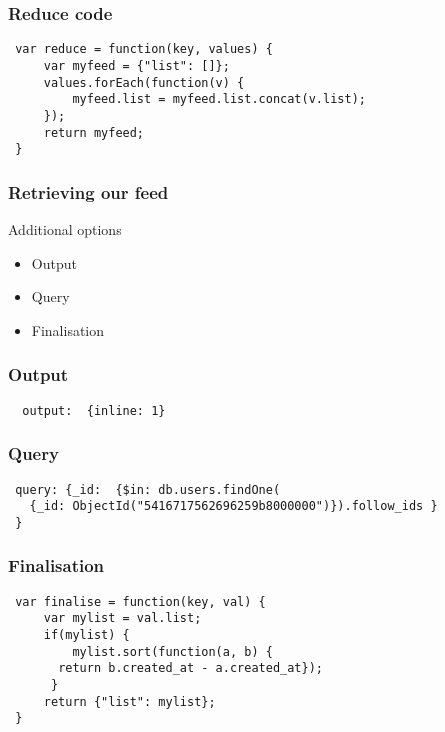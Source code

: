 \documentclass[10pt]{beamer}
\begin{document}
\begin{frame}[fragile]
  \frametitle{Reduce code}

 \begin{verbatim}
 var reduce = function(key, values) {
     var myfeed = {"list": []};
     values.forEach(function(v) {
         myfeed.list = myfeed.list.concat(v.list);
     });
     return myfeed;
 }
	     \end{verbatim}

\end{frame}


\begin{frame}
  \frametitle{Retrieving our feed}

  Additional options
 \begin{itemize}
  \item Output
  \item Query
  \item Finalisation
 \end{itemize}


\end{frame}
\begin{frame}[fragile]

  \frametitle{Output}

 \begin{verbatim}
  output:  {inline: 1}
 \end{verbatim}

\end{frame}


\begin{frame}[fragile]
  \frametitle{Query}

 \begin{verbatim}
 query: {_id:  {$in: db.users.findOne(
   {_id: ObjectId("5416717562696259b8000000")}).follow_ids }
 }
 \end{verbatim}

\end{frame}


\begin{frame}[fragile]
  \frametitle{Finalisation}

 \begin{verbatim}
 var finalise = function(key, val) {
     var mylist = val.list;
     if(mylist) {
         mylist.sort(function(a, b) { 
	   return b.created_at - a.created_at});
      }
     return {"list": mylist};
 }

 \end{verbatim}

\end{frame}
\end{document}
